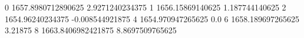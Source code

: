 0 1657.8980712890625 2.9271240234375
1 1656.15869140625 1.187744140625
2 1654.96240234375 -0.008544921875
4 1654.970947265625 0.0
6 1658.189697265625 3.21875
8 1663.8406982421875 8.8697509765625

